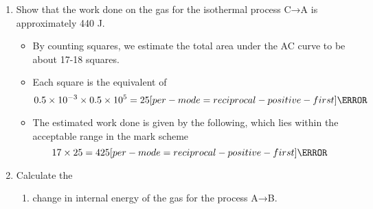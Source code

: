 \documentclass[a4paper,12pt]{article}
\let\oldsi\si
\renewcommand{\si}[1]{\oldsi[per-mode=reciprocal-positive-first]{#1}}
\begin{document}
\begin{enumerate}[label=(\alph*)]
  \item Show that the work done on the gas for the isothermal process C→A is approximately 440 J.
        \begin{itemize}
          \item By counting squares, we estimate the total area under the AC curve to be about 17-18 squares.
          \item Each square is the equivalent of $$0.5 \times 10^{-3} \times 0.5 \times 10^5 = 25\si{\joule}$$
          \item The estimated work done is given by the following, which lies within the acceptable range in the mark scheme $$17 \times 25 = 425\si{\joule}$$
        \end{itemize}
  \item Calculate the
        \begin{enumerate}[label=(\roman*)]
          \item change in internal energy of the gas for the process A→B.
        \end{enumerate}
\end{enumerate}
\end{document}
